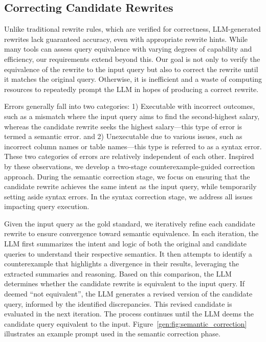

\subsection{Correcting Candidate Rewrites}
\label{gen:sec:approach:correct}


Unlike traditional rewrite rules, which are verified for correctness, LLM-generated rewrites lack guaranteed accuracy, even with appropriate rewrite hints. While many tools can assess query equivalence with varying degrees of capability and efficiency, our requirements extend beyond this. Our goal is not only to verify the equivalence of the rewrite to the input query but also to correct the rewrite until it matches the original query. Otherwise, it is inefficient and a waste of computing resources to repeatedly prompt the LLM in hopes of producing a correct rewrite.

Errors generally fall into two categories: 1) Executable with incorrect outcomes, such as a mismatch where the input query aims to find the second-highest salary, whereas the candidate rewrite seeks the highest salary—this type of error is termed a semantic error. and 2) Unexecutable due to various issues, such as incorrect column names or table names—this type is referred to as a syntax error. These two categories of errors are relatively independent of each other. Inspired by these observations, we develop a two-stage counterexample-guided correction approach. During the semantic correction stage, we focus on ensuring that the candidate rewrite achieves the same intent as the input query, while temporarily setting aside syntax errors. In the syntax correction stage, we address all issues impacting query execution.


 Given the input query as the gold standard, we iteratively refine each candidate rewrite to ensure convergence toward semantic equivalence. 
In each iteration, the LLM first summarizes the intent and logic of both the original and candidate queries to understand their respective semantics. It then attempts to identify a counterexample that highlights a divergence in their results, leveraging the extracted summaries and  reasoning. Based on this comparison, the LLM determines whether the candidate rewrite is equivalent to the input query. If deemed ``not equivalent'', the LLM generates a revised version of the candidate query, informed by the identified discrepancies. This revised candidate is evaluated in the next iteration. The process continues until the LLM deems the candidate query equivalent to the input.
Figure~\ref{gen:fig:semantic_correction} illustrates an example prompt used in the semantic correction phase.







